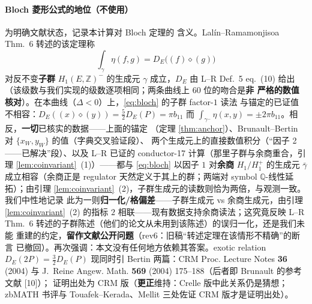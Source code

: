 \documentclass[11pt,a4paper]{ctexart}
\theoremstyle{remark}
\newcommand{\QQ}{\mathbb{Q}}
\newcommand{\ZZ}{\mathbb{Z}}
\newcommand{\bN}{b_{11}}
\begin{document}
\paragraph{Bloch 菱形公式的地位（不使用）}为明确文献状态，记录本计算对 Bloch 定理的
含义。Lal\'in--Ramamonjisoa Thm.~6 转述的该定理称
\[
\int_{\gamma}\eta(f,g)=D_E\big((f)\diamond(g)\big)\tag{B}\label{eq:bloch}
\]
对反不变\textbf{子群} $H_1(E,\ZZ)^-$ 的生成元 $\gamma$ 成立，$D_E$ 由 L--R Def.~5
eq.~(10) 给出（该级数与我们实现的级数逐项相同；两条曲线上 $60$ 位的吻合是\textbf{非
严格的数值核对}）。在本曲线（$\Delta<0$）上，\eqref{eq:bloch} 的子群 factor-$1$ 读法
与锚定的已证值不相容：$D_E((x)\diamond(y))=\frac52D_E(P)=\pi\bN$ 而
$\int_{\gamma^-}\eta(x,y)=\pm2\pi\bN$。相反，\textbf{一切}已核实的数据——上面的锚定
（定理 \ref{thm:anchor}）、Brunault--Bertin 对 $\{x_W,y_W\}$ 的值（字典交叉验证段）、
两个生成元上的直接数值积分（``因子 2——已解决''段）、以及 L--R 已证的 conductor-17
计算（那里子群与余商重合，引理 \ref{lem:coinvariant}~(1)）——都与 \eqref{eq:bloch}
以因子 $1$ 对\textbf{余商} $H_1/H_1^+$ 的生成元 $\bar\gamma$ 成立相容（余商正是
regulator 天然定义于其上的群；两端对 symbol $\QQ$-线性延拓）；由引理
\ref{lem:coinvariant}~(2)，子群生成元的读数则恰为两倍，与观测一致。我们中性地记录
此为一则\textbf{归一化/格偏差}——子群生成元 vs 余商生成元，由引理
\ref{lem:coinvariant}~(2) 的指标 $2$ 相联——现有数据支持余商读法；这究竟反映
L--R Thm.~6 转述的子群陈述（他们的论文从未用到该陈述）的误归一化，还是我们未能
重建的约定，\textbf{留作文献公开问题}（rev6：旧稿``转述定理在该情形不精确''的断言
已撤回）。再次强调：本文没有任何地方依赖其答案。exotic relation $D_E(2P)=\frac32D_E(P)$
现同时引 Bertin 两篇：CRM Proc. Lecture Notes \textbf{36} (2004) 与
J.~Reine Angew. Math. \textbf{569} (2004) 175--188（后者即 Brunault 的参考文献 [10]）；
证明出处为 CRM 版（\textbf{更正}维持：Crelle 版中此关系仍是猜想；zbMATH 书评与
Touafek--Kerada、Mellit 三处佐证 CRM 版才是证明出处）。
\end{document}
